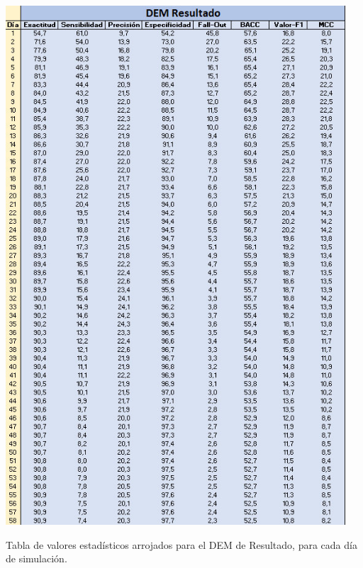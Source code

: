 \documentclass[10pt,a4paper, twoside]{report}
\begin{document}
\begin{table}[H]
   \centering      
   \includegraphics[width=0.95\textwidth]{imagenes/TablaResultado2.jpg}
 \caption{Tabla de valores estadísticos arrojados para el DEM de Resultado, para cada día de simulación.}
 \label{TablaResultado}
\end{table}
\end{document}
